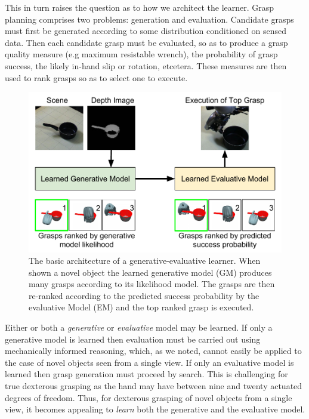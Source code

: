 This in turn raises the question as to how we architect the learner. Grasp planning comprises two problems: generation and evaluation. Candidate grasps must first be generated according to some distribution conditioned on sensed data. Then each candidate grasp must be evaluated, so as to produce a grasp quality measure (e.g maximum resistable wrench), the probability of grasp success, the likely in-hand slip or rotation, etcetera. These measures are then used to rank grasps so as to select one to execute.
\begin{figure}[t]
\begin{center}
  \includegraphics[width=0.7\columnwidth]{images/contribution.pdf}
  \end{center}
  \caption{The basic architecture of a generative-evaluative learner. When shown a novel object the learned generative model (GM) produces many grasps according to its likelihood model. The grasps are then re-ranked according to the predicted success probability by the evaluative Model (EM) and the top ranked grasp is executed.}
\label{fig:systemArchitecture}
\end{figure}
Either or both a {\em generative} or {\em evaluative} model may be learned. If only a generative model is learned then evaluation must be carried out using mechanically informed reasoning, which, as we noted, cannot easily be applied to the case of novel objects seen from a single view. If only an evaluative model is learned then grasp generation must proceed by search. This is challenging for true dexterous grasping as the hand may have between nine and twenty actuated degrees of freedom. Thus, for dexterous grasping of novel objects from a single view, it becomes appealing to {\em learn} both the generative and the evaluative model. 

